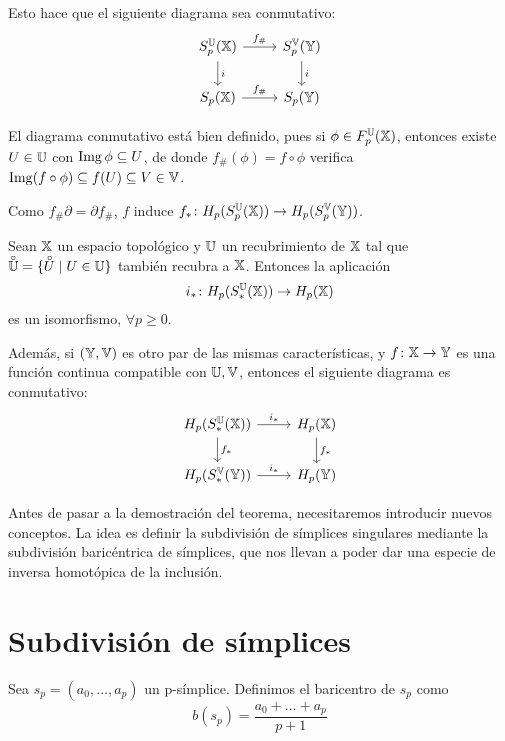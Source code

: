 Esto hace que el siguiente diagrama sea conmutativo:
\[ \begin{tikzcd}
  S_p^\U(\X) \arrow{r}{f_\#} \arrow{d}{i} & S_p^\V(\Y) \arrow{d}{i} \\
  \SX{p} \arrow{r}{f_\#} & \SY{p}
\end{tikzcd} \]

\begin{remark}
  El diagrama conmutativo está bien definido, pues si $\phi \in F_p^{\mathbb U}({\mathbb X})$, entonces existe $U \in {\mathbb U}$ con $\operatorname{Img} \phi \subseteq U$, de donde
  $f_\#(\phi) = f \circ \phi$ verifica $\operatorname{Img}(f \circ \phi) \subseteq f(U) \subseteq V \in {\mathbb V}$.
\end{remark}

Como $f_\# \partial = \partial f_\#$, $f$ induce $f_* \colon H_p(S_p^{\mathbb U}({\mathbb X})) \to H_p(S_p^{\mathbb V}({\mathbb Y}))$.

\begin{theorem}
  Sean ${\mathbb X}$ un espacio topológico y ${\mathbb U}$ un recubrimiento de ${\mathbb X}$ tal que $\interior{\U} = \{\interior{U} \mid U \in \U\}$
  también recubra a ${\mathbb X}$. Entonces la aplicación
  \[ i_* \colon H_p(S_*^{\mathbb U}({\mathbb X})) \to H_p({\mathbb X}) \]
  es un isomorfismo, $\forall p \geq 0$.

  Además, si $({\mathbb Y}, {\mathbb V})$ es otro par de las mismas características, y $f \colon {\mathbb X} \to {\mathbb Y}$ es una función continua
  compatible con ${\mathbb U}, {\mathbb V}$, entonces el siguiente diagrama es conmutativo:
  \[ \begin{tikzcd}
    H_p(S_*^\U(\X)) \arrow{r}{i_*} \arrow{d}{f_*} & H_p(\X) \arrow{d}{f_*} \\
    H_p(S_*^\V(\Y)) \arrow{r}{i_*} & H_p(\Y)
  \end{tikzcd} \]

\end{theorem}

Antes de pasar a la demostración del teorema, necesitaremos introducir nuevos conceptos. La idea es definir la subdivisión
de símplices singulares mediante la subdivisión baricéntrica de símplices, que nos llevan a poder dar una especie de
inversa homotópica de la inclusión.

\section{Subdivisión de símplices}

\begin{definition}
  Sea $s_p = (a_0, \dots, a_p)$ un p-símplice. Definimos el baricentro de $s_p$ como
  \[b(s_p) = \frac{a_0 + \dots + a_p}{p+1}\]
\end{definition}

